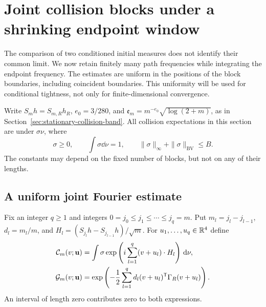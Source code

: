 \section{Joint collision blocks under a shrinking endpoint window}
\label{sec:multiblock-bridge-windows}
The comparison of two conditioned initial measures does not identify
their common limit. We now retain finitely many path frequencies while
integrating the endpoint frequency. The estimates are uniform in the
positions of the block boundaries, including coincident boundaries.
This uniformity will be used for conditional tightness, not only for
finite-dimensional convergence.

Write $S_mh=S_{m,R}h_R$, $e_0=3/280$, and
$\mathfrak e_m=m^{-e_0}\sqrt{\log(2+m)}$, as in
Section~\ref{sec:stationary-collision-band}. All collision expectations
in this section are under $\sigma\nu$, where
\begin{equation}\label{eq:bridge-initial-class}
 \sigma\ge0,\qquad \int\sigma\dd\nu=1,\qquad
 \|\sigma\|_\infty+\|\sigma\|_{\mathrm{BV}}\le B.
\end{equation}
The constants may depend on the fixed number of blocks, but not on
any of their lengths.

\subsection{A uniform joint Fourier estimate}
Fix an integer $q\ge1$ and integers
$0=j_0\le j_1\le\cdots\le j_q=m$. Put
$m_l=j_l-j_{l-1}$, $d_l=m_l/m$, and
$H_l=(S_{j_l}h-S_{j_{l-1}}h)/\sqrt m$.
For $u_1,\ldots,u_q\in\mathbb R^4$ define
\begin{align}
 \mathcal C_m(v;\mathbf u)
 &=\int\sigma\exp\left(i\sum_{l=1}^q(v+u_l)\cdot H_l\right)\dd\nu,
 \notag\\
 \mathcal G_m(v;\mathbf u)
 &=\exp\left(-\frac12\sum_{l=1}^q
               d_l(v+u_l)^{\mathsf T}\Gamma_R(v+u_l)\right).
 \label{eq:multiblock-characteristic}
\end{align}
An interval of length zero contributes zero to both expressions.

